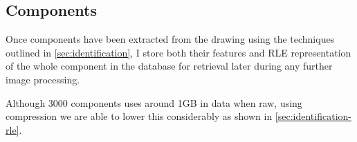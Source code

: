 
\subsection{Components}

Once components have been extracted from the drawing using the techniques outlined in \cref{sec:identification}, I store both their features and \acrfull{RLE} representation of the whole component in the database for retrieval later during any further image processing.

Although 3000 components uses around 1GB in data when raw, using compression we are able to lower this considerably as shown in \ref{sec:identification-rle}.


